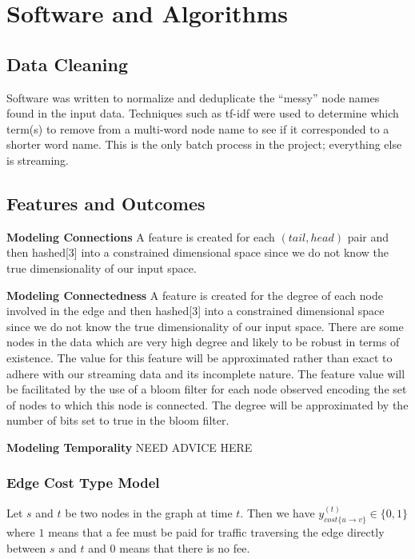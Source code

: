 \documentclass{article} %
\begin{document}
\section{Software and Algorithms}

\subsection{Data Cleaning}
Software was written to normalize and deduplicate the ``messy'' node names
found in the input data.  Techniques such as tf-idf were used to determine
which term(s) to remove from a multi-word node name to see if it
corresponded to a shorter word name.  This is the only batch process in the project; everything else is streaming.

\subsection{Features and Outcomes}

\textbf{Modeling Connections} A feature is created for each $(tail,head)$ pair and then hashed[3] into a
constrained dimensional space since we do not know the true dimensionality
of our input space.  

\textbf{Modeling Connectedness} A feature is created for the degree of each node
  involved in the edge  and then hashed[3] into a
constrained dimensional space since we do not know the true dimensionality
of our input space.  There are some nodes in
  the data which are very high degree and likely to be robust in terms of
  existence.  The value for this feature will be approximated rather than
  exact to adhere with our streaming data and its incomplete nature.  The feature value will be facilitated by the use of a
  bloom filter for each node observed encoding the set of nodes to which
  this node is connected.  The degree will be approximated by the
  number of bits set to true in the bloom filter.  

\textbf{Modeling Temporality} NEED ADVICE HERE

\subsubsection{Edge Cost Type Model}
Let $s$ and $t$ be two nodes in the graph at time $t$.  Then we have $y_{cost\{u \rightarrow v\}}^{(t)} \in \{0,1\}$ where $1$ means that a fee must be paid for
traffic traversing the edge directly
between $s$ and $t$ and $0$ means that there is no fee.
\end{document}
